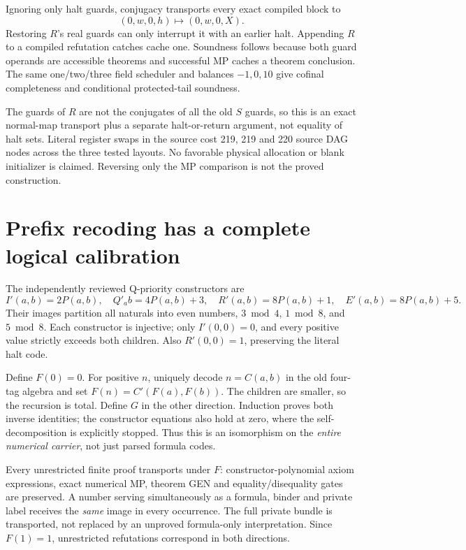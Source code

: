 \documentclass[11pt]{article}
\begin{document}
Ignoring only halt guards, conjugacy transports every exact compiled block to
\[
 (0,w,0,h)\longmapsto(0,w,0,X).
\]
Restoring $R$'s real guards can only interrupt it with an earlier halt. Appending $R$ to a compiled refutation catches cache one. Soundness follows because both guard operands are accessible theorems and successful MP caches a theorem conclusion. The same one/two/three field scheduler and balances $-1,0,10$ give cofinal completeness and conditional protected-tail soundness.

The guards of $R$ are not the conjugates of all the old $S$ guards, so this is an exact normal-map transport plus a separate halt-or-return argument, not equality of halt sets. Literal register swaps in the source cost 219, 219 and 220 source DAG nodes across the three tested layouts. No favorable physical allocation or blank initializer is claimed. Reversing only the MP comparison is not the proved construction.

\section{Prefix recoding has a complete logical calibration}
The independently reviewed Q-priority constructors are
\[
 I'(a,b)=2P(a,b),\quad Q'_ab=4P(a,b)+3,\quad
 R'(a,b)=8P(a,b)+1,\quad E'(a,b)=8P(a,b)+5.
\]
Their images partition all naturals into even numbers, $3\bmod4$, $1\bmod8$, and $5\bmod8$. Each constructor is injective; only $I'(0,0)=0$, and every positive value strictly exceeds both children. Also $R'(0,0)=1$, preserving the literal halt code.

Define $F(0)=0$. For positive $n$, uniquely decode $n=C(a,b)$ in the old four-tag algebra and set $F(n)=C'(F(a),F(b))$. The children are smaller, so the recursion is total. Define $G$ in the other direction. Induction proves both inverse identities; the constructor equations also hold at zero, where the self-decomposition is explicitly stopped. Thus this is an isomorphism on the \emph{entire numerical carrier}, not just parsed formula codes.

Every unrestricted finite proof transports under $F$: constructor-polynomial axiom expressions, exact numerical MP, theorem GEN and equality/disequality gates are preserved. A number serving simultaneously as a formula, binder and private label receives the \emph{same} image in every occurrence. The full private bundle is transported, not replaced by an unproved formula-only interpretation. Since $F(1)=1$, unrestricted refutations correspond in both directions.
\end{document}
